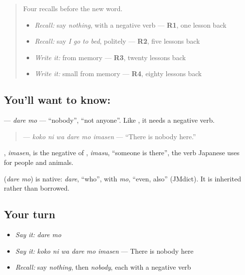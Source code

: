 \label{lesson:JA-C139-daremo}



\begin{quote}
Four recalls before the new word.

\begin{itemize}
\raggedright
  \item \emph{Recall:} say \emph{nothing}, with a negative verb — \textbf{R1}, one lesson back
  \item \emph{Recall:} say \emph{I go to bed}, politely — \textbf{R2}, five lessons back
  \item \emph{Write it:} \textbf{} from memory — \textbf{R3}, twenty lessons back
  \item \emph{Write it:} small \textbf{} from memory — \textbf{R4}, eighty lessons back
\end{itemize}
\end{quote}

\subsection*{You'll want to know: }
\textbf{} — \emph{dare mo} — \textquotedblleft{}nobody\textquotedblright{}, \textquotedblleft{}not anyone\textquotedblright{}. Like \textbf{}, it needs a negative verb.

\begin{quote}
\textbf{  } — \emph{koko ni wa dare mo imasen} — \textquotedblleft{}There is nobody here.\textquotedblright{}
\end{quote}

\textbf{}, \emph{imasen}, is the negative of \textbf{}, \emph{imasu}, \textquotedblleft{}someone is there\textquotedblright{}, the verb Japanese uses for people and animals.

\begin{cousinweb}
\textbf{} (\emph{dare mo}) is native: \emph{dare}, \textquotedblleft{}who\textquotedblright{}, with \emph{mo}, \textquotedblleft{}even, also\textquotedblright{} (JMdict). It is inherited rather than borrowed.
\end{cousinweb}

\subsection*{Your turn}
\begin{itemize}
\raggedright
  \item \emph{Say it:} \emph{dare mo}
  \item \emph{Say it:} \emph{koko ni wa dare mo imasen} — There is nobody here
  \item \emph{Recall:} say \emph{nothing}, then \emph{nobody}, each with a negative verb
\end{itemize}


